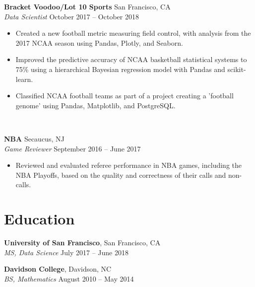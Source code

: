 \documentclass[line, margin]{res}
\begin{document}
\begin{resume}
	\textbf{Bracket Voodoo/Lot 10 Sports} \hfill{San Francisco, CA} \vspace{1mm}\\\vspace{0.5mm}%
	\textsl{Data Scientist} \hfill {October 2017 -- October 2018}\
	\begin{itemize}
		\item Created a new football metric measuring field control, with analysis from the 2017 NCAA season using Pandas, Plotly, and Seaborn.
		\item Improved the predictive accuracy of NCAA basketball statistical systems to 75\% using a hierarchical Bayesian regression model with Pandas and scikit-learn.
		\item Classified NCAA football teams as part of a project creating a 'football genome' using Pandas, Matplotlib, and PostgreSQL.
	\end{itemize}\

	\textbf{NBA} \hfill{Secaucus, NJ} \vspace{1mm}\\\vspace{0.5mm}%
	\textsl{Game Reviewer} \hfill {September 2016 -- June 2017}\
	\begin{itemize}
		\item Reviewed and evaluated referee performance in NBA games, including the NBA Playoffs, based on the quality and correctness of their calls and non-calls.
	\end{itemize}
	
	
\section{Education}
	\textbf{University of San Francisco}, San Francisco, CA \vspace{1mm}\\\vspace{1mm}
	\textsl{MS, Data Science} \hfill {July 2017 -- June 2018}\

	\textbf{Davidson College}, Davidson, NC \vspace{1mm}\\\vspace{-1mm}
	\textsl{BS, Mathematics} \hfill {August 2010 -- May 2014}



\end{resume}
\end{document}
